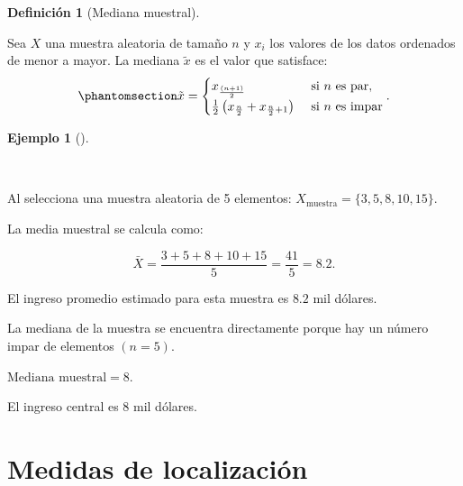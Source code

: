\documentclass[
  us-letterpaper,
]{scrreprt}
\theoremstyle{plain}
\theoremstyle{definition}
\newtheorem{definition}{Definición}[chapter]
\theoremstyle{definition}
\newtheorem{example}{Ejemplo}[chapter]
\theoremstyle{remark}
\begin{document}
\begin{definition}[Mediana
muestral]\protect\hypertarget{def-medianam}{}\label{def-medianam}

Sea \(X\) una muestra aleatoria de tamaño \(n\) y \(x_i\) los valores de
los datos ordenados de menor a mayor. La mediana \(\tilde{x}\) es el
valor que satisface: \begin{equation}\phantomsection\label{eq-medianam}{
\tilde{x}= \begin{cases} x_{\frac {(n+1)}{2}} & \text{ si } n \text{ es par}  ,\\ \frac{1}{2} \left(x_{\frac{n}{2}} +  x_{\frac{n}{2} +1} \right)  & \text{ si } n \text{ es impar} 
  \end{cases}.
}\end{equation}

\end{definition}

\begin{example}[]\protect\hypertarget{exm-IMA}{}\label{exm-IMA}

~

\begin{tcolorbox}[enhanced jigsaw, colback=white, toptitle=1mm, arc=.35mm, rightrule=.15mm, left=2mm, colframe=quarto-callout-caution-color-frame, breakable, leftrule=.75mm, colbacktitle=quarto-callout-caution-color!10!white, coltitle=black, opacityback=0, bottomtitle=1mm, bottomrule=.15mm, titlerule=0mm, opacitybacktitle=0.6, toprule=.15mm, title={\textbf{Selección de una muestra aleatoria}}]

Al selecciona una muestra aleatoria de 5 elementos:
\(X_\text{muestra} = \{ 3,5,8,10,15 \}.\)

La media muestral se calcula como:

\[\bar{X} = \frac{3 + 5 + 8 + 10 + 15 }{5} = \frac{41}{5} = 8.2. \]

El ingreso promedio estimado para esta muestra es \(8.2\) mil dólares.

La mediana de la muestra se encuentra directamente porque hay un número
impar de elementos \((n = 5).\)

\(\text{Mediana muestral} = 8\).

El ingreso central es 8 mil dólares.

\end{tcolorbox}

\end{example}

\section{Medidas de localización}\label{medidas-de-localizaciuxf3n}
\end{document}
